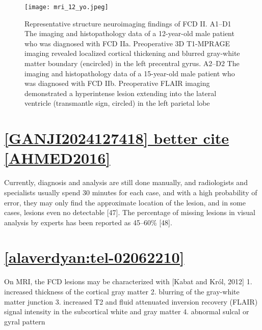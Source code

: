\begin{figure}[htbp]
	\centering
	\texttt{[image: mri\_12\_yo.jpeg]}
	\caption{Representative structure neuroimaging findings of FCD II. A1–D1 The imaging and histopathology data of a 12-year-old male patient who was diagnosed with FCD IIa. Preoperative 3D T1-MPRAGE imaging revealed localized cortical thickening and blurred gray-white matter boundary (encircled) in the left precentral gyrus. A2–D2 The imaging and histopathology data of a 15-year-old male patient who was diagnosed with FCD IIb. Preoperative FLAIR imaging demonstrated a hyperintense lesion extending into the lateral ventricle (transmantle sign, circled) in the left parietal lobe}%
\end{figure}

\section{\href{https://www.sciencedirect.com/science/article/pii/S0925231224001899}{[GANJI2024127418] better cite [AHMED2016]}}

Currently, diagnosis and analysis are still done manually, and radiologists and specialists usually spend 30 minutes for each case, and with a high probability of error, they may only find the approximate location of the lesion, and in some cases, lesions even no detectable [47]. The percentage of missing lesions in visual analysis by experts has been reported as 45–60\% [48].

\section{\href{https://hal.science/tel-02062210v2/file/these.pdf}{[alaverdyan:tel-02062210]}}

On MRI, the FCD lesions may be characterized with [Kabat and Król, 2012]
1. increased thickness of the cortical gray matter
2. blurring of the gray-white matter junction
3. increased T2 and ﬂuid attenuated inversion recovery (FLAIR) signal intensity in the
subcortical white and gray matter
4. abnormal sulcal or gyral pattern
